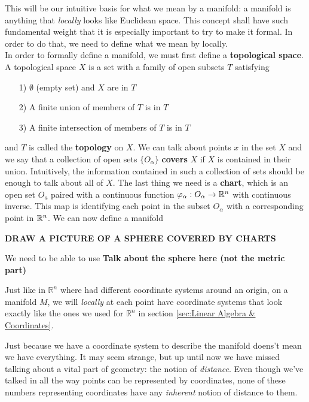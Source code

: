 	This will be our intuitive basis for what we mean by a manifold: a manifold is anything that \emph{locally} looks like Euclidean space. This concept shall have such fundamental weight that it is especially important to try to make it formal. In order to do that, we need to define what we mean by locally.\\
	
	 In order to formally define a manifold, we must first define a \textbf{topological space}.  
	A topological space $X$ is a set with a family of open subsets $T$ satisfying 
	 \begin{enumerate}
	 	\item[1)] $\emptyset$ (empty set) and $X$ are in $T$
	 	\item[2)] A finite union of members of $T$ is in $T$
	 	\item[3)] A finite intersection of members of $T$ is in $T$
	 \end{enumerate}
	 and $T$ is called the \textbf{topology} on $X$.  We can talk about points $x$ in the set $X$ and we say that a collection of open sets $\{O_\alpha \}$ \textbf{covers} $X$ if $X$ is contained in their union.  Intuitively, the information contained in such a collection of sets should be enough to talk about all of $X$.  The last thing we need is a \textbf{chart}, which is an open set $O_a$ paired with a continuous function $\varphi_\alpha: O_\alpha \to \mathbb{R}^n$ with continuous inverse.  This map is identifying each point in the subset $O_\alpha$ with a corresponding point in $\mathbb{R}^n$.  We can now define a manifold\
	 
	 \textbf{DRAW A PICTURE OF A SPHERE COVERED BY CHARTS}
	
	
	We need to be able to use 
	\textbf{Talk about the sphere here (not the metric part)}
	
	Just like in $\mathbb{R}^n$ where had different coordinate systems around an origin, on a manifold $M$, we will \emph{locally} at each point have coordinate systems that look exactly like the ones we used for $\mathbb{R}^n$ in section \ref{sec:Linear Algebra & Coordinates}. 
	
	Just because we have a coordinate system to describe the manifold doens't mean we have everything. It may seem strange, but up until now we have missed talking about a vital part of geometry: the notion of \emph{distance}. Even though we've talked in all the way points can be represented by coordinates, none of these numbers representing coordinates have any \emph{inherent} notion of distance to them. 
	

